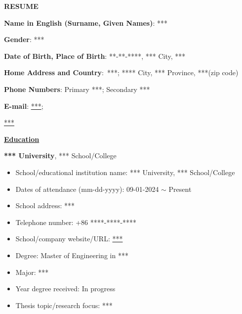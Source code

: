 \documentclass[a4paper,11pt]{article}
\begin{document}
\begin{center}
    {\Large \bfseries RESUME}
\end{center}

\noindent\textbf{Name in English (Surname, Given Names)}: *** %

\noindent\textbf{Gender}: *** %

\noindent\textbf{Date of Birth, Place of Birth}: **-**-****, *** City, *** %

\noindent\textbf{Home Address and Country}:\
***; **** City, *** Province, ***(zip code) %

\noindent\textbf{Phone Numbers}: Primary ***; Secondary *** %

\noindent\textbf{E-mail}: \href{mailto:***}{***}; 

\href{mailto:***}{***} %

\noindent\underline{\textbf{Education}}\par\vspace{0.4\baselineskip}

\noindent\textbf{*** University}, *** School/College %
\begin{itemize}[leftmargin=1.5em]
    \item School/educational institution name: *** University, *** School/College %
    \item Dates of attendance (mm-dd-yyyy): 09-01-2024 $\sim$ Present %
    \item School address: *** %
    \item Telephone number: +86 ****-****-**** %
    \item School/company website/URL: \href{***}{***} %
    \item Degree: Master of Engineering in *** %
    \item Major: *** %
    \item Year degree received: In progress %
    \item Thesis topic/research focus: *** %
\end{itemize}
\end{document}

